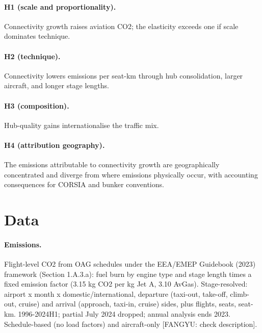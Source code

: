 \documentclass[12pt]{article}
\begin{document}
\paragraph{H1 (scale and proportionality).} Connectivity growth raises
aviation CO2; the elasticity exceeds one if scale dominates technique.
\paragraph{H2 (technique).} Connectivity lowers emissions per seat-km through
hub consolidation, larger aircraft, and longer stage lengths.
\paragraph{H3 (composition).} Hub-quality gains internationalise the traffic
mix.
\paragraph{H4 (attribution geography).} The emissions attributable to
connectivity growth are geographically concentrated and diverge from where
emissions physically occur, with accounting consequences for CORSIA and
bunker conventions.

\section{Data}
\paragraph{Emissions.} Flight-level CO2 from OAG schedules under the EEA/EMEP
Guidebook (2023) framework (Section 1.A.3.a): fuel burn by engine type and
stage length times a fixed emission factor (3.15 kg CO2 per kg Jet A, 3.10
AvGas). Stage-resolved: airport x month x domestic/international, departure
(taxi-out, take-off, climb-out, cruise) and arrival (approach, taxi-in,
cruise) sides, plus flights, seats, seat-km. 1996-2024H1; partial July 2024
dropped; annual analysis ends 2023. Schedule-based (no load factors) and
aircraft-only [FANGYU: check description].
\end{document}
